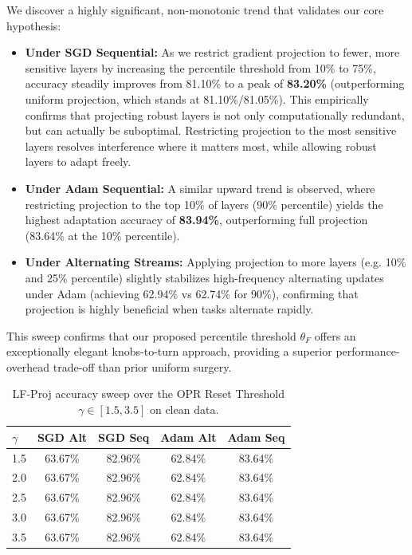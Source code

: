 \documentclass{article}
\theoremstyle{plain}
\theoremstyle{definition}
\theoremstyle{remark}
\begin{document}
We discover a highly significant, non-monotonic trend that validates our core hypothesis:
\begin{itemize}
    \item \textbf{Under SGD Sequential:} As we restrict gradient projection to fewer, more sensitive layers by increasing the percentile threshold from 10\% to 75\%, accuracy steadily improves from 81.10\% to a peak of \textbf{83.20\%} (outperforming uniform projection, which stands at 81.10\%/81.05\%). This empirically confirms that projecting robust layers is not only computationally redundant, but can actually be suboptimal. Restricting projection to the most sensitive layers resolves interference where it matters most, while allowing robust layers to adapt freely.
    \item \textbf{Under Adam Sequential:} A similar upward trend is observed, where restricting projection to the top 10\% of layers (90\% percentile) yields the highest adaptation accuracy of \textbf{83.94\%}, outperforming full projection (83.64\% at the 10\% percentile).
    \item \textbf{Under Alternating Streams:} Applying projection to more layers (e.g. 10\% and 25\% percentile) slightly stabilizes high-frequency alternating updates under Adam (achieving 62.94\% vs 62.74\% for 90\%), confirming that projection is highly beneficial when tasks alternate rapidly.
\end{itemize}
This sweep confirms that our proposed percentile threshold $\theta_F$ offers an exceptionally elegant knobs-to-turn approach, providing a superior performance-overhead trade-off than prior uniform surgery.

\begin{table}[h]
\caption{LF-Proj accuracy sweep over the OPR Reset Threshold $\gamma \in [1.5, 3.5]$ on clean data.}
\label{tab:gamma_sweep}
\vskip 0.15in
\begin{center}
\begin{small}
\begin{sc}
\begin{tabular}{lcccc}
\toprule
$\gamma$ & SGD Alt & SGD Seq & Adam Alt & Adam Seq \\
\midrule
1.5 & 63.67\% & 82.96\% & 62.84\% & 83.64\% \\
2.0 & 63.67\% & 82.96\% & 62.84\% & 83.64\% \\
2.5 & 63.67\% & 82.96\% & 62.84\% & 83.64\% \\
3.0 & 63.67\% & 82.96\% & 62.84\% & 83.64\% \\
3.5 & 63.67\% & 82.96\% & 62.84\% & 83.64\% \\
\bottomrule
\end{tabular}
\end{sc}
\end{small}
\end{center}
\vskip -0.1in
\end{table}
\end{document}
